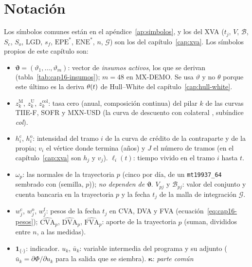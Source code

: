\section{Notación}\label{sec:cap16-notacion}

Los símbolos comunes están en el apéndice~\ref{ap:simbolos}, y los del XVA ($t_j$, $V$, $\mathcal B$, $S_c$, $S_o$,
$\mathrm{LGD}$, $s_f$, $\mathrm{EPE}^*$, $\mathrm{ENE}^*$, $n$, $\mathcal G$) son los del capítulo~\ref{cap:xva}. Los
símbolos propios de este capítulo son:
\begin{itemize}
  \item $\boldsymbol\vartheta=(\vartheta_1,\dots,\vartheta_m)$: vector de \emph{insumos activos}, los que se derivan
        (tabla~\ref{tab:cap16-insumos}); $m=48$ en MX-DEMO. Se usa $\vartheta$ y no $\theta$ porque este último es la
        deriva $\theta(t)$ de Hull--White del capítulo~\ref{cap:hull-white}.
  \item $z^{\mathrm M}_k$, $z^{\mathrm U}_k$, $z^{\mathrm{col}}_k$: tasa cero (anual, composición continua) del pilar
        $k$ de las curvas TIIE-F, SOFR y MXN-USD (la curva de descuento con colateral \USD, subíndice \emph{col}).
  \item $h^{\mathrm c}_i$, $h^{\mathrm o}_i$: intensidad del tramo $i$ de la curva de crédito de la contraparte y de la
        propia; $v_i$ el vértice donde termina (años) y $J$ el número de tramos (en el capítulo~\ref{cap:xva} son
        $h_j$ y $v_j$). $\ell_i(t)$: tiempo vivido en el tramo $i$ hasta $t$.
  \item $\omega_p$: las normales de la trayectoria $p$ (cinco por día, de un \texttt{mt19937\_64} sembrado con
        (semilla, $p$)); \emph{no dependen de $\boldsymbol\vartheta$}. $V_{pj}$ y $\mathcal B_{pj}$: valor del
        conjunto y cuenta bancaria en la trayectoria $p$ y la fecha $t_j$ de la malla de integración $\mathcal G$.
  \item $w^{\mathrm c}_j$, $w^{\mathrm o}_j$, $w^{\mathrm f}_j$: pesos de la fecha $t_j$ en CVA, DVA y FVA
        (ecuación~\eqref{eq:cap16-pesos}); $\widehat{\mathrm{CVA}}_p$, $\widehat{\mathrm{DVA}}_p$,
        $\widehat{\mathrm{FVA}}_p$: aporte de la trayectoria $p$ (suman, divididos entre $n$, a las medidas).
  \item $\mathbf 1_{\{\cdot\}}$: indicador. $u_k$, $\bar u_k$: variable intermedia del programa y su adjunto
        ($\bar u_k=\partial\Phi/\partial u_k$ para la salida que se siembra). $\boldsymbol\kappa$: \emph{parte común}

\end{itemize}
